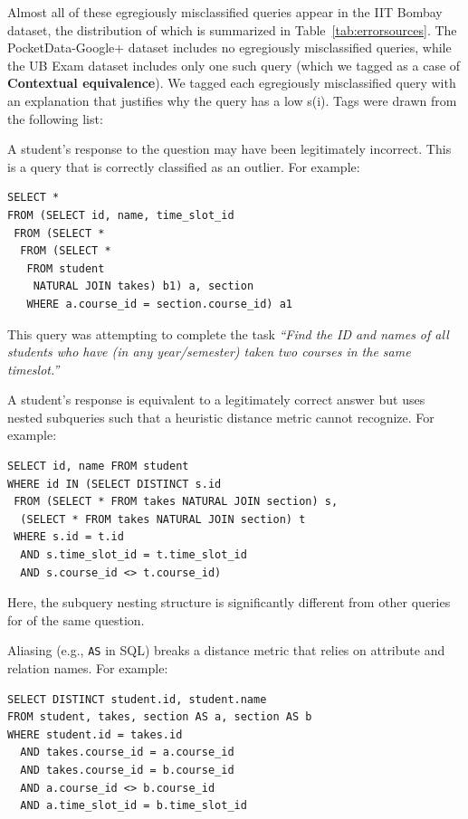 Almost all of these egregiously misclassified queries appear in the IIT Bombay dataset, the distribution of which is summarized in Table~\ref{tab:errorsources}.
The PocketData-Google+ dataset includes no egregiously misclassified queries, while the UB Exam dataset includes only one such query (which we tagged as a case of \textbf{Contextual equivalence}).
We tagged each egregiously misclassified query with an explanation that justifies why the query has a low s(i). 
Tags were drawn from the following list:

\smallskip
{} A student's response to the question may have been legitimately incorrect. This is a query that is correctly classified as an outlier.
For example: 
{\footnotesize
\begin{verbatim}
SELECT *
FROM (SELECT id, name, time_slot_id
 FROM (SELECT *
  FROM (SELECT *
   FROM student
    NATURAL JOIN takes) b1) a, section
   WHERE a.course_id = section.course_id) a1
\end{verbatim}
}
This query was attempting to complete the task \textit{``Find the ID and names of all students who have (in any year/semester) taken two courses in the same timeslot.''}

\smallskip
{} A student's response is equivalent to a legitimately correct answer but uses nested subqueries such that a heuristic distance metric cannot recognize.
For example: 
{\footnotesize
\begin{verbatim}
SELECT id, name FROM student
WHERE id IN (SELECT DISTINCT s.id
 FROM (SELECT * FROM takes NATURAL JOIN section) s,
  (SELECT * FROM takes NATURAL JOIN section) t
 WHERE s.id = t.id
  AND s.time_slot_id = t.time_slot_id
  AND s.course_id <> t.course_id)
\end{verbatim}
}

Here, the subquery nesting structure is significantly different from other queries for of the same question.

\smallskip
{} Aliasing (e.g., \texttt{AS} in SQL) breaks a distance metric that relies on attribute and relation names.
For example:
{\footnotesize
\begin{verbatim}
SELECT DISTINCT student.id, student.name
FROM student, takes, section AS a, section AS b
WHERE student.id = takes.id
  AND takes.course_id = a.course_id
  AND takes.course_id = b.course_id
  AND a.course_id <> b.course_id
  AND a.time_slot_id = b.time_slot_id
\end{verbatim}
}

